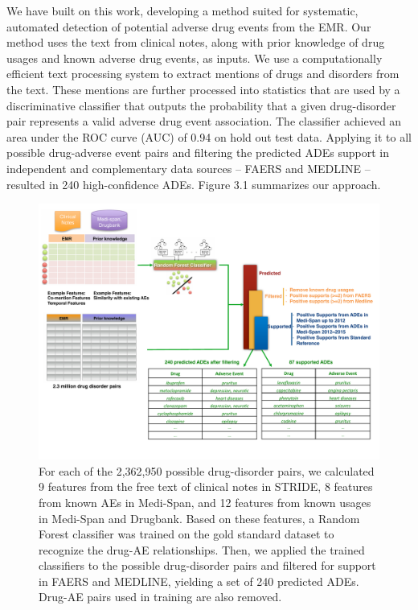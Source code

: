 We have built on this work, developing a method suited for systematic,
automated detection of potential adverse drug events from the EMR. Our
method uses the text from clinical notes, along with prior knowledge
of drug usages and known adverse drug events, as inputs. We use a
computationally efficient text processing system to extract mentions
of drugs and disorders from the text. These mentions are further
processed into statistics that are used by a discriminative classifier
that outputs the probability that a given drug-disorder pair
represents a valid adverse drug event association. The classifier
achieved an area under the ROC curve (AUC) of 0.94 on hold out test
data. Applying it to all possible drug-adverse event pairs and
filtering the predicted ADEs support in independent and complementary
data sources – FAERS and MEDLINE – resulted in 240 high-confidence
ADEs. Figure 3.1 summarizes our approach.

\begin{figure}
  \begin{center}
    \includegraphics[width=0.9\linewidth]{ch3-figures/Figure1.pdf}
  \end{center}
  \caption[Feature engineeering for ADE discovery]{For each of the
    2,362,950 possible drug-disorder pairs, we calculated 9 features
    from the free text of clinical notes in STRIDE, 8 features from
    known AEs in Medi-Span, and 12 features from known usages in
    Medi-Span and Drugbank. Based on these features, a Random Forest
    classifier was trained on the gold standard dataset to recognize
    the drug-AE relationships. Then, we applied the trained
    classifiers to the possible drug-disorder pairs and
    filtered for support in FAERS and MEDLINE, yielding a set of 240
    predicted ADEs. Drug-AE pairs used in training are also removed.  }
  \label{fig:short}
\end{figure}


